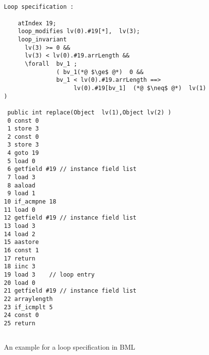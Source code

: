 \begin{figure}
\begin{lstlisting}[frame=trbl]

  
Loop specification :

    atIndex 19;
    loop_modifies lv(0).#19[*],  lv(3);
    loop_invariant
      lv(3) >= 0 &&  
      lv(3) < lv(0).#19.arrLength &&
      \forall  bv_1 ; 
               ( bv_1(*@ $\ge$ @*)  0 &&
               bv_1 < lv(0).#19.arrLength ==> 
                    lv(0).#19[bv_1]  (*@ $\neq$ @*)  lv(1) )

 public int replace(Object  lv(1),Object lv(2) )
 0 const 0
 1 store 3
 2 const 0
 3 store 3
 4 goto 19
 5 load 0
 6 getfield #19 // instance field list
 7 load 3
 8 aaload
 9 load 1
10 if_acmpne 18 
11 load 0
12 getfield #19 // instance field list
13 load 3
14 load 2
15 aastore
16 const 1
17 return
18 iinc 3  
19 load 3    // loop entry 
20 load 0
21 getfield #19 // instance field list 
22 arraylength
23 if_icmplt 5
24 const 0
25 return
 
\end{lstlisting}
\caption{\sc An example for a loop specification in BML} \label{bml:loopBML}\end{figure}




